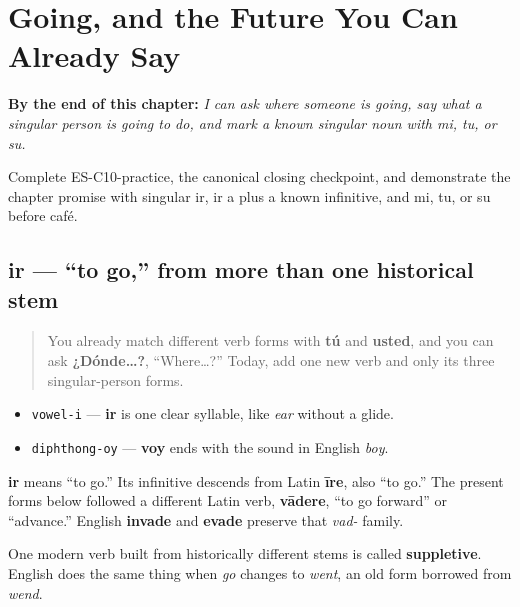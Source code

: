 
\chapter{Going, and the Future You Can Already Say}
\label{ch:ir-y-futuro}

\begin{chapteropening}
\textbf{By the end of this chapter:} \emph{I can ask where someone is going, say what a singular person is going to do, and mark a known singular noun with mi, tu, or su.}

Complete ES-C10-practice, the canonical closing checkpoint, and demonstrate the chapter promise with singular ir, ir a plus a known infinitive, and mi, tu, or su before café.
\end{chapteropening}

\section[ir]{ir — “to go,” from more than one historical stem}

\label{lesson:ES-C10-ir}



\begin{quote}
You already match different verb forms with \textbf{tú} and \textbf{usted}, and you can ask \textbf{¿Dónde…?}, “Where…?” Today, add one new verb and only its three singular-person forms.
\end{quote}

\begin{sounds}
\begin{itemize}
\raggedright
  \item \texttt{vowel-i} — \textbf{ir} is one clear syllable, like \emph{ear} without a glide.
  \item \texttt{diphthong-oy} — \textbf{voy} ends with the sound in English \emph{boy}.
\end{itemize}
\end{sounds}

\begin{cousinweb}
\textbf{ir} means “to go.” Its infinitive descends from Latin \textbf{īre}, also “to go.” The present forms below followed a different Latin verb, \textbf{vādere}, “to go forward” or “advance.” English \textbf{invade} and \textbf{evade} preserve that \emph{vad-} family.

One modern verb built from historically different stems is called \textbf{suppletive}. English does the same thing when \emph{go} changes to \emph{went}, an old form borrowed from \emph{wend}.
\end{cousinweb}

